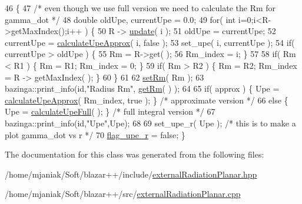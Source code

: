 \begin{DoxyCode}
46                                        \{
47   \textcolor{comment}{/* even though we use full version we need to calculate the Rm for gamma\_dot */}
48   \textcolor{keywordtype}{double} oldUpe, currentUpe = 0.0;
49   \textcolor{keywordflow}{for}( \textcolor{keywordtype}{int} i=0;i<R->getMaxIndex();i++ ) \{
50     R -> \hyperlink{classexternalRadiationPlanar_acfddae49394d11c89d1d47229ba8a3f7}{update}( i );   
51     oldUpe = currentUpe;
52     currentUpe = \hyperlink{classexternalRadiationPlanar_a963d1270de3666c72509d5b1d405d72a}{calculateUpeApprox}( i, \textcolor{keyword}{false} );
53     set\_upe( i, currentUpe );
54     \textcolor{keywordflow}{if}( currentUpe > oldUpe ) \{
55       Rm = R->get( );
56       Rm\_index = i; \}
57     
58     \textcolor{keywordflow}{if}( Rm < R1 ) \{ Rm = R1; Rm\_index = 0; \}
59     \textcolor{keywordflow}{if}( Rm > R2 ) \{ Rm = R2; Rm\_index = R -> getMaxIndex( ); \}
60   \}
61   
62   \hyperlink{classexternalRadiationPlanar_ad66a3f1f4fcc90ea0eeb40a9c3e1379a}{setRm}( Rm );
63   bazinga::print\_info(\textcolor{keywordtype}{id},\textcolor{stringliteral}{"Radius Rm"}, \hyperlink{classexternalRadiationPlanar_a3d9b58ccd4fcc4cdf50e583891897954}{getRm}( ) );
64   
65   \textcolor{keywordflow}{if}( approx ) \{ Upe = \hyperlink{classexternalRadiationPlanar_a963d1270de3666c72509d5b1d405d72a}{calculateUpeApprox}( Rm\_index, \textcolor{keyword}{true} ); \}  \textcolor{comment}{/* approximate version */}
66   \textcolor{keywordflow}{else} \{ Upe = \hyperlink{classexternalRadiationPlanar_a14eca037d735b9cd1ad6d8f433052c62}{calculateUpeFull}( ); \}  \textcolor{comment}{/* full integral version */}
67   bazinga::print\_info(\textcolor{keywordtype}{id},\textcolor{stringliteral}{"Upe"},Upe);
68   
69   set\_upe\_r( Upe ); \textcolor{comment}{/* this is to make a plot gamma\_dot vs r */}
70   \hyperlink{classenergyDissProc_a7b51925f603e271657cab66afe822591}{flag\_upe\_r} = \textcolor{keyword}{false}; \}
\end{DoxyCode}


The documentation for this class was generated from the following files\-:\begin{DoxyCompactItemize}
\item 
/home/mjaniak/\-Soft/blazar++/include/\hyperlink{externalRadiationPlanar_8hpp}{external\-Radiation\-Planar.\-hpp}\item 
/home/mjaniak/\-Soft/blazar++/src/\hyperlink{externalRadiationPlanar_8cpp}{external\-Radiation\-Planar.\-cpp}\end{DoxyCompactItemize}
